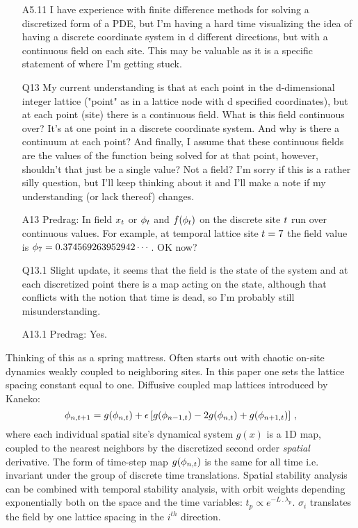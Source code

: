 \begin{description}
\begin{itemize}
	\item[A5.11]
I have experience with finite difference methods for solving a
discretized form of a PDE, but I'm having a hard time visualizing the
idea of having a discrete coordinate system in d different directions,
but with a continuous field on each site. This  may be valuable as it is
a specific statement of where I'm getting stuck.
	\item[Q13]
My current understanding is
that at each point in the d-dimensional integer lattice ("point" as in a
lattice node with d specified coordinates), but at each point (site)
there is a continuous field. What is this field continuous over? It's at
one point in a discrete coordinate system. And why is there a continuum
at each point? And finally, I assume that these continuous fields are the
values of the function being solved for at that point, however, shouldn't
that just be a single value? Not a field? I'm sorry if this is a rather
silly question, but I'll keep thinking about it and I'll make a note if
my understanding (or lack thereof) changes.
	\item[A13]
Predrag: In  field $x_{t}$ or $\phi_{t}$ and
$f(\phi_{t})$  on the discrete site $t$ run over continuous values.
For example, at temporal lattice site $t=7$ the field value is
$\phi_7=0.374569263952942\cdots$. OK now?
	\item[Q13.1]
Slight update, it seems that the field is the state of the system and at each discretized point there is a map acting on the state, although that conflicts with the notion that time is dead, so I'm probably still misunderstanding.
	\item[A13.1]
Predrag: Yes.
\end{itemize}
Thinking of this as a spring mattress. Often starts out with chaotic on-site dynamics weakly coupled to neighboring sites.
In this paper one sets the lattice spacing constant equal to one. Diffusive coupled map lattices introduced by Kaneko:
\[
\phi_{n,t+1}=
g(\phi_{n,t})+\epsilon\left[g(\phi_{n-1,t})-2g(\phi_{n,t})+g(\phi_{n+1,t})\right]
\,,
\]
where each individual spatial site's dynamical system $g(x)$ is a 1D map, coupled to the nearest neighbors by the discretized second order \emph{spatial} derivative. The form of time-step map $g(\phi_{n,t})$ is the same for all time i.e. invariant under the group of discrete time translations. Spatial stability analysis can be combined with temporal stability analysis, with orbit weights depending exponentially both on the space and the time variables: $t_p\propto e^{-L\period{}\lambda_p}$. $\sigma_i$ translates the field by one lattice spacing in the $i^{th}$ direction.

\end{description}

